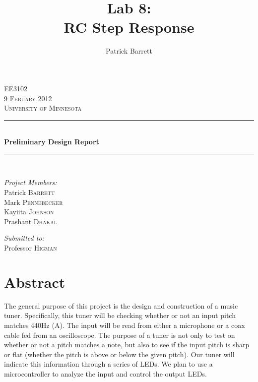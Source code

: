 \documentclass[12pt]{article}
\title{Lab 8:\\RC Step Response} %
\author{Patrick Barrett}
\date{}                                           %
\newcommand{\HRule}{\rule{\linewidth}{0.5mm}}
\begin{document}
\begin{singlespace}

\begin{center}
 
 

 
\textsc{\LARGE EE3102}\\[0.5cm]
 

\textsc{\Large 9 Febuary 2012}\\[0.5cm]

\textsc{\Large University of Minnesota}\\[0.5cm]
 
 
\HRule \\[0.4cm]
{ \huge \bfseries Preliminary Design Report}\\[0.4cm]
 
\HRule \\[1cm]
 
\begin{minipage}{0.4\textwidth}
\begin{flushleft} \large
\emph{Project Members:}\\
Patrick \textsc{Barrett} \\
Mark \textsc{Pennebecker} \\
Kayiita  \textsc{Johnson} \\
Prashant \textsc{Dhakal} \\
\end{flushleft}
\end{minipage}
\begin{minipage}{0.4\textwidth}
\begin{flushright} \large
\emph{Submitted to:} \\
Professor \textsc{Higman}\\
\end{flushright}
\end{minipage}
\end{center}


\section*{Abstract}
The general purpose of this project is the design and construction of a music tuner. Specifically, this
tuner will be checking whether or not an input pitch matches 440Hz (A). The input will be read from
either a microphone or a coax cable fed from an oscilloscope. The purpose of a tuner is not only to test
on whether or not a pitch matches a note, but also to see if the input pitch is sharp or flat (whether the
pitch is above or below the given pitch). Our tuner will indicate this information through a series of
LEDs. We plan to use a microcontroller to analyze the input and control the output LEDs.
\end{singlespace}
\end{document}
